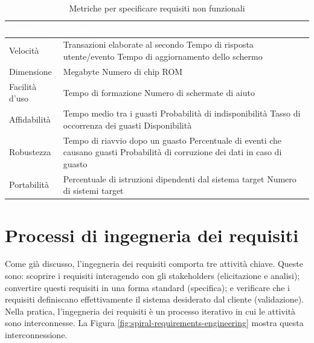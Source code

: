 \begin{table}[ht]
\centering
{}
\begin{tabular}{|p{4cm}|p{11cm}|}
\hline
\rowcolor{headerblue}
\textbf{\textcolor{white}{Proprietà}} & \textbf{\textcolor{white}{Misura}} \\\hline
Velocità & Transazioni elaborate al secondo \newline Tempo di risposta utente/evento \newline Tempo di aggiornamento dello schermo\\\hline
Dimensione & Megabyte \newline Numero di chip ROM\\\hline
Facilità d'uso & Tempo di formazione \newline Numero di schermate di aiuto\\\hline
Affidabilità & Tempo medio tra i guasti \newline Probabilità di indisponibilità	 \newline Tasso di occorrenza dei guasti \newline Disponibilità\\\hline
Robustezza & Tempo di riavvio dopo un guasto \newline Percentuale di eventi che causano guasti \newline Probabilità di corruzione dei dati in caso di guasto\\\hline
Portabilità & Percentuale di istruzioni dipendenti dal sistema target \newline Numero di sistemi target
\\\hline
\end{tabular}
\caption{Metriche per specificare requisiti non funzionali}
\label{tab:metrics-nonfuncional-requirements}
\end{table}

\section{Processi di ingegneria dei requisiti}
Come già discusso, l'ingegneria dei requisiti comporta tre attività chiave. Queste sono: scoprire i requisiti interagendo con gli stakeholders (elicitazione e analisi); convertire questi requisiti in una forma standard (specifica); e verificare che i requisiti definiscano effettivamente il sistema desiderato dal cliente (validazione). Nella pratica, l'ingegneria dei requisiti è un processo iterativo in cui le attività sono interconnesse. La Figura \ref{fig:spiral-requirements-engineering} mostra questa interconnessione.

